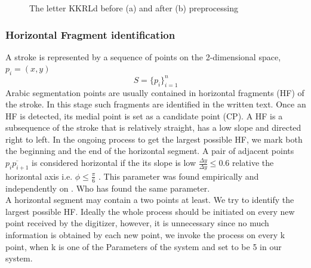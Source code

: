 \documentclass[12pt,journal,compsoc]{IEEEtran}
\begin{document}
\begin{figure}
	\centering
    \caption{The letter KKRL{d} before (a) and after (b) preprocessing}
   \label{fig:same_main_body_letters}
\end{figure}

\subsubsection{Horizontal Fragment identification}

A stroke is represented by a sequence of points on the 2-dimensional space, $p_{i}=(x,y)$ 
\begin{equation}
S=\{p_{i}\}_{i=1}^{n}
\end{equation}
Arabic segmentation points are usually contained in horizontal fragments (HF) of the stroke. In this stage such fragments are identified in the written text. Once an HF is detected, its medial point is set as a candidate point (CP). A HF is a subsequence of the stroke that is relatively straight, has a low slope and directed right to left. In the ongoing process to get the largest possible HF, we mark both the beginning and the end of the horizontal segment. 
A pair of adjacent points $\overline{p_{i}p_{i+1}}$ is considered horizontal if the its slope is low $\frac{\Delta y}{\Delta y}\leq0.6$ relative the horizontal axis i.e. $\phi \leq \frac{\pi}{6}$ . This parameter was found empirically and independently on \cite{daifallah2009recognition}. Who has found the same parameter. \\

A horizontal segment may contain a two points at least. We try to identify the largest possible HF. Ideally the whole process should be initiated on every new point received by the digitizer, however, it is unnecessary since no much information is obtained by each new point, we invoke the process on every k point, when k is one of the Parameters of the system and set to be 5 in our system.   
\end{document}
